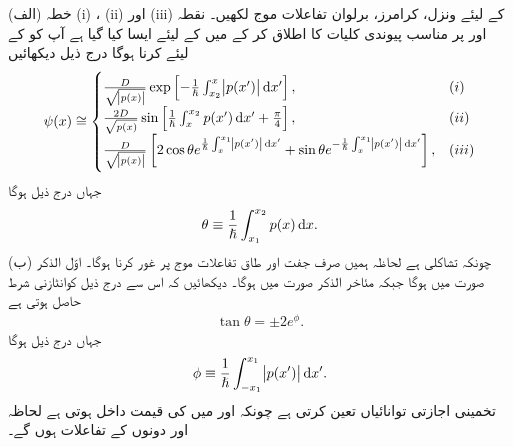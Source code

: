 (الف) خطہ (i) ، (ii)  اور (iii)  کے لیئے ونزل، کرامرز، برلوان تفاعلات موج لکھیں۔ نقطہ  اور  پر مناسب پیوندی کلیات کا اطلاق کر کے  میں  کے لیئے ایسا کیا گیا ہے آپ کو  کے لیئے کرنا ہوگا درج ذیل دیکھائیں
\begin{align*}
	\psi(x)\cong
	\begin{cases}
		\frac{D}{\sqrt{\abs{p(x)}}} \exp\left[-\frac{1}{\hslash}\int^{x}_{x_{2}}\abs{p(x')}\dif x'\right],& (i) \\
		\frac{2D}{\sqrt{p(x)}} \sin\left[\frac{1}{\hslash}\int^{x_{2}}_{x}p(x')\dif x'+\frac{\pi}{4}\right],& (ii) \\
		\frac{D}{\sqrt{\abs{p(x)}}}\left[2 \cos\theta e^{\frac{1}{\hslash}\int^{x_{1}}_{x}\abs{p(x')}\dif x'} +\sin\theta e^{-\frac{1}{\hslash}\int^{x_{1}}_{x}\abs{p(x')}\dif x'}\right],& (iii)
	\end{cases}
\end{align*}
جہاں درج ذیل ہوگا
\begin{align}
	\theta\equiv\frac{1}{\hslash}\int^{x_{2}}_{x_{1}}p(x)\dif  x.
\end{align}
(ب) چونکہ  تشاکلی ہے لحاظہ ہمیں صرف جفت  اور طاق  تفاعلات موج پر غور کرنا ہوگا۔ اوّل الذکر صورت میں  ہوگا جبکہ مئاخر الذکر صورت میں  ہوگا۔ دیکھائیں کہ اس سے درج ذیل کوانٹازنی شرط حاصل ہوتی ہے
\begin{align}
	\tan\theta=\pm 2e^{\phi}.
\end{align}
جہاں درج ذیل ہوگا
\begin{align}
	\phi\equiv\frac{1}{\hslash}\int^{x_{1}}_{-x_{1}}\abs{p(x')}\dif x'.
\end{align}
 تخمینی اجازتی توانائیاں تعین کرتی ہے چونکہ  اور  میں  کی قیمت داخل ہوتی ہے لحاظہ  اور  دونوں  کے تفاعلات ہوں گے۔


